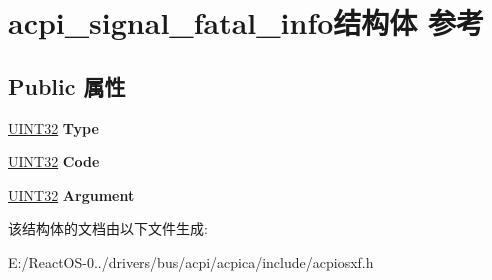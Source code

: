 \hypertarget{structacpi__signal__fatal__info}{}\section{acpi\+\_\+signal\+\_\+fatal\+\_\+info结构体 参考}
\label{structacpi__signal__fatal__info}
\subsection*{Public 属性}
\begin{DoxyCompactItemize}
\item 
\mbox{\label{structacpi__signal__fatal__info_a60c3b0d8c4cef27ad1900f2447adca5d}} 
\hyperlink{_processor_bind_8h_ae1e6edbbc26d6fbc71a90190d0266018}{U\+I\+N\+T32} {\bfseries Type}
\item 
\mbox{\label{structacpi__signal__fatal__info_a09d8f4772967935798f464050834e74c}} 
\hyperlink{_processor_bind_8h_ae1e6edbbc26d6fbc71a90190d0266018}{U\+I\+N\+T32} {\bfseries Code}
\item 
\mbox{\label{structacpi__signal__fatal__info_a7a0ef44b30ea12fee33450a0c80e8070}} 
\hyperlink{_processor_bind_8h_ae1e6edbbc26d6fbc71a90190d0266018}{U\+I\+N\+T32} {\bfseries Argument}
\end{DoxyCompactItemize}


该结构体的文档由以下文件生成\+:\begin{DoxyCompactItemize}
\item 
E\+:/\+React\+O\+S-\/0../drivers/bus/acpi/acpica/include/acpiosxf.\+h\end{DoxyCompactItemize}
